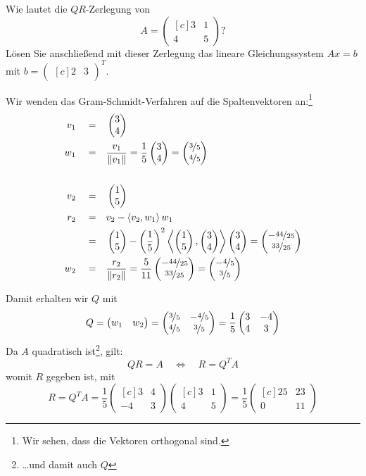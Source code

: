\documentclass[answers]{exam}
\newcommand{\norm}[1]{\left\| #1 \right\|}
\newcommand{\scalarprod}[1]{\left\langle #1 \right\rangle}
\newcommand{\vektor}[1]{\begin{pmatrix*}[c] #1 \end{pmatrix*}}
\begin{document}
\begin{questions}
    \newpage
    \question
    Wie lautet die $QR$-Zerlegung von
    $$
        A = \vektor{3 & 1 \\ 4 & 5}?
    $$
    Lösen Sie anschließend mit dieser Zerlegung das lineare Gleichungssystem $Ax = b$ mit $b = \vektor{2 & 3}^T$.
    \begin{solution}
        Wir wenden das Gram-Schmidt-Verfahren auf die Spaltenvektoren an:\footnote{Wir sehen, dass die Vektoren orthogonal sind.}
        $$
            \begin{aligned}
                v_1 \quad = \quad & \vektor{3                                                        \\4} \\
                w_1 \quad = \quad & \frac{v_1}{\norm{v_1}} = \frac{1}{5}\vektor{3                    \\4} = \vektor{\nicefrac{3}{5}\\\nicefrac{4}{5}} \\
                \\
                v_2 \quad = \quad & \vektor{1                                                        \\5} \\
                r_2 \quad = \quad & v_2 - \scalarprod{v_2, w_1}w_1                                   \\
                = \quad           & \vektor{1                                                        \\ 5} - \left( \frac{1}{5} \right)^2\scalarprod{\vektor{1 \\ 5}, \vektor{3 \\ 4}}\vektor{3 \\ 4} =  \vektor{-\nicefrac{44}{25}                      \\ \nicefrac{33}{25}}\\
                w_2 \quad = \quad & \frac{r_2}{\norm{r_2}} = \frac{5}{11} \vektor{-\nicefrac{44}{25} \\ \nicefrac{33}{25}} = \vektor{-\nicefrac{4}{5} \\ \nicefrac{3}{5}}
            \end{aligned}
        $$

        Damit erhalten wir $Q$ mit
        $$
            Q = \vektor{w_1 & w_2} =  \vektor{\nicefrac{3}{5} & -\nicefrac{4}{5} \\ \nicefrac{4}{5} & \nicefrac{3}{5}} = \frac{1}{5} \vektor{3 & -4 \\ 4 & 3}
        $$
        Da $A$ quadratisch ist\footnote{\ldots und damit auch $Q$}, gilt:
        $$
            QR = A \quad \iff \quad R = Q^TA
        $$
        womit $R$ gegeben ist, mit
        $$
            R = Q^TA = \frac{1}{5}\vektor{3 & 4 \\ -4 & 3} \vektor{3 & 1 \\ 4 & 5} = \frac{1}{5} \vektor{25 & 23 \\ 0 & 11}
        $$


\end{solution}
\end{questions}
\end{document}
